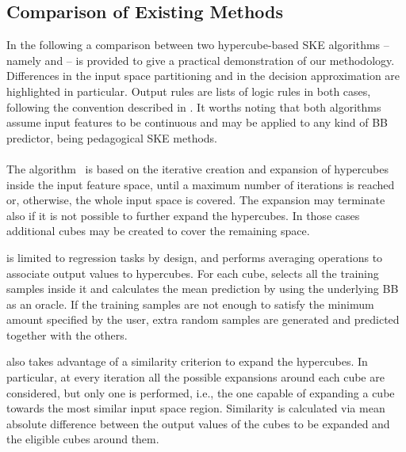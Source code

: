 \documentclass[
]{ceurart}
\begin{document}
\subsection{Comparison of Existing Methods}

In the following a comparison between two hypercube-based SKE algorithms %
-- namely \iter{} and \gridex{} -- is provided to give a practical demonstration of our methodology.
%
Differences in the input space partitioning and in the decision approximation are highlighted in particular.
%
Output rules are lists of logic rules in both cases, following the convention described in .
%
It worths noting that both algorithms assume input features to be continuous and may be applied to any kind of BB predictor, being pedagogical SKE methods.

\paragraph{\iter}

The \iter{} algorithm~\cite{huysmans2006iter} is based on the iterative creation and expansion of hypercubes inside the input feature space, until a maximum number of iterations is reached or, otherwise, the whole input space is covered.
%
The expansion may terminate also if it is not possible to further expand the hypercubes.
%
In those cases additional cubes may be created to cover the remaining space.

\iter{} is limited to regression tasks by design, and performs averaging operations to associate output values to hypercubes.
%
For each cube, \iter{} selects all the training samples inside it and calculates the mean prediction by using the underlying BB as an oracle.
%
If the training samples are not enough to satisfy the minimum amount specified by the user, extra random samples are generated and predicted together with the others.

\iter{} also takes advantage of a similarity criterion to expand the hypercubes.
%
In particular, at every iteration all the possible expansions around each cube are considered, but only one is performed, i.e., the one capable of expanding a cube towards the most similar input space region.
%
Similarity is calculated via mean absolute difference between the output values of the cubes to be expanded and the eligible cubes around them.

\paragraph{\gridex{}}
\end{document}
